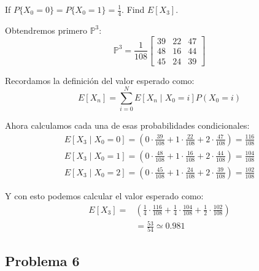 \documentclass{article}
\begin{document}
            If $P\{X_0 = 0\} = P\{X_0 = 1\} = \frac{1}{4}$. Find $E\left[X_3\right]$.

            Obtendremos primero $\mathbb{P}^{3}$:
            \begin{equation}
                \mathbb{P}^{3} = \frac{1}{108} \begin{bmatrix}
                    39 & 22 & 47 \\
                    48 & 16 & 44 \\
                    45 & 24 & 39
                \end{bmatrix}
            \end{equation}
            
            Recordamos la definición del valor esperado como:
            \begin{equation}
                E\left[X_n\right] = \sum_{i=0}^{N} E\left[X_n \mid X_0 = i\right] P(X_0 = i)
            \end{equation}

            Ahora calculamos cada una de esas probabilidades condicionales:
            \begin{gather*}
                E\left[X_3 \mid X_0 = 0\right] = \left(0 \cdot \frac{39}{108} + 1 \cdot \frac{22}{108} + 2 \cdot \frac{47}{108} \right) = \frac{116}{108} \\
                E\left[X_3 \mid X_0 = 1\right] = \left(0 \cdot \frac{48}{108} + 1 \cdot \frac{16}{108} + 2 \cdot \frac{44}{108} \right) = \frac{104}{108} \\
                E\left[X_3 \mid X_0 = 2\right] = \left(0 \cdot \frac{45}{108} + 1 \cdot \frac{24}{108} + 2 \cdot \frac{39}{108} \right) = \frac{102}{108}
            \end{gather*}

            Y con esto podemos calcular el valor esperado como:
            \begin{equation*}
                \begin{split}
                    E\left[X_3\right] =& \left(\frac{1}{4} \cdot \frac{116}{108} + \frac{1}{4} \cdot \frac{104}{108} + \frac{1}{2} \cdot \frac{102}{108} \right) \\
                    & = \frac{53}{54} \simeq 0.981
                \end{split}
            \end{equation*}

        \subsection*{Problema 6}
\end{document}
